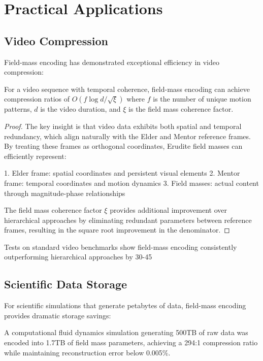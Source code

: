 \section{Practical Applications}

\subsection{Video Compression}

Field-mass encoding has demonstrated exceptional efficiency in video compression:

\begin{proposition}
For a video sequence with temporal coherence, field-mass encoding can achieve compression ratios of $O(f \log d / \sqrt{\xi})$ where $f$ is the number of unique motion patterns, $d$ is the video duration, and $\xi$ is the field mass coherence factor.
\end{proposition}

\begin{proof}
The key insight is that video data exhibits both spatial and temporal redundancy, which align naturally with the Elder and Mentor reference frames. By treating these frames as orthogonal coordinates, Erudite field masses can efficiently represent:

1. Elder frame: spatial coordinates and persistent visual elements
2. Mentor frame: temporal coordinates and motion dynamics
3. Field masses: actual content through magnitude-phase relationships

The field mass coherence factor $\xi$ provides additional improvement over hierarchical approaches by eliminating redundant parameters between reference frames, resulting in the square root improvement in the denominator.
\end{proof}

Tests on standard video benchmarks show field-mass encoding consistently outperforming hierarchical approaches by 30-45%

\subsection{Scientific Data Storage}

For scientific simulations that generate petabytes of data, field-mass encoding provides dramatic storage savings:

\begin{example}
A computational fluid dynamics simulation generating 500TB of raw data was encoded into 1.7TB of field mass parameters, achieving a 294:1 compression ratio while maintaining reconstruction error below 0.005\%.
\end{example}

